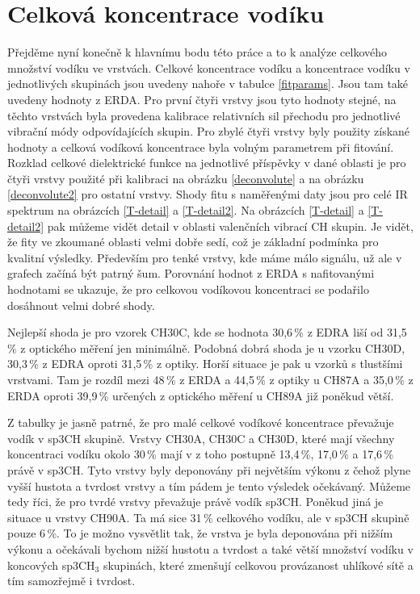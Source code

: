 \section{Celková koncentrace vodíku}
Přejděme nyní konečně k hlavnímu bodu této práce a to k analýze celkového množství vodíku ve vrstvách. Celkové koncentrace vodíku a koncentrace vodíku v jednotlivých skupinách jsou uvedeny nahoře v tabulce \ref{fitparams}. 
Jsou tam také uvedeny hodnoty z ERDA. Pro první čtyři vrstvy jsou tyto hodnoty stejné, na těchto vrstvách byla provedena kalibrace relativních sil přechodu pro jednotlivé vibrační módy odpovídajících skupin. 
Pro zbylé čtyři vrstvy byly použity získané hodnoty a celková vodíková koncentrace byla volným parametrem při fitování. Rozklad celkové dielektrické funkce na jednotlivé příspěvky v dané oblasti je pro čtyři vrstvy použité při kalibraci na obrázku \ref{deconvolute} a na obrázku \ref{deconvolute2} pro ostatní vrstvy. 
Shody fitu s naměřenými daty jsou pro celé IR spektrum na obrázcích \ref{T-detail} a \ref{T-detail2}. Na obrázcích \ref{T-detail} a \ref{T-detail2} pak můžeme vidět detail v oblasti valenčních vibrací CH skupin. Je vidět, že fity ve zkoumané oblasti velmi dobře sedí, což je základní podmínka pro kvalitní výsledky. Především pro tenké vrstvy, kde máme málo signálu, už ale v grafech začíná být patrný šum.  
Porovnání hodnot z ERDA s nafitovanými hodnotami se ukazuje, že pro celkovou vodíkovou koncentraci se podařilo dosáhnout velmi dobré shody.

Nejlepší shoda je pro vzorek CH30C, kde se hodnota 30,6\,\% z EDRA liší od 31,5\,\% z optického měření jen minimálně. Podobná dobrá shoda je u vzorku CH30D, 30,3\,\% z EDRA oproti 31,5\,\% z optiky. Horší situace je pak u vzorků s tlustšími vrstvami. Tam je rozdíl mezi 48\,\% z ERDA a 44,5\,\% z optiky u CH87A a 35,0\,\% z ERDA oproti 39,9\,\% určených z optického měření u CH89A již poněkud větší.

Z tabulky je jasně patrné, že pro malé celkové vodíkové koncentrace převažuje vodík v sp3CH skupině. Vrstvy CH30A, CH30C a CH30D, které mají všechny koncentraci vodíku okolo 30\,\% mají v z toho postupně 13,4\,\%, 17,0\,\% a 17,6\,\% právě v sp3CH. Tyto vrstvy byly deponovány při největším výkonu z čehož plyne vyšší hustota a tvrdost vrstvy a tím pádem je tento výsledek očekávaný. 
Můžeme tedy říci, že pro tvrdé vrstvy převažuje právě vodík sp3CH. Poněkud jiná je situace u vrstvy CH90A. Ta má sice 31\,\% celkového vodíku, ale v sp3CH skupině pouze 6\,\%. To je možno vysvětlit tak, že vrstva je byla deponována při nižším výkonu a očekávali bychom nižší hustotu a tvrdost a také větší množství vodíku v koncových sp3CH$_3$ skupinách, které zmenšují celkovou provázanost uhlíkové sítě a tím samozřejmě i tvrdost. 

